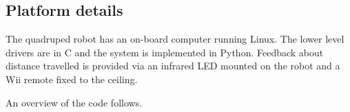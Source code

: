 \subsection{Platform details}




The quadruped robot has an on-board computer running Linux. The lower
level drivers are in C and the system is implemented in
Python. Feedback about distance travelled is provided via an infrared
LED mounted on the robot and a Wii remote fixed to the ceiling.

An overview of the code follows.

